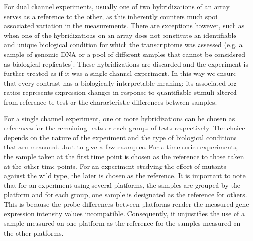For dual channel experiments, usually one of two hybridizations of an array
serves as a reference to the other, as this inherently counters much spot
associated variation in the measurements.
%
There are exceptions however, such as when one of the hybridizations on an
array does not constitute an identifiable and unique biological condition for
which the transcriptome was assessed (e.g. a sample of genomic DNA or a pool of
different samples that cannot be considered as biological replicates).
%
These hybridizations are discarded and the experiment is further treated as if
it was a single channel experiment.
%
In this way we ensure that every contrast has a biologically interpretable
meaning: its associated log-ratios represents expression changes in response
to quantifiable stimuli altered from reference to test or the characteristic
differences between samples.

For a single channel experiment, one or more hybridizations can be chosen as
references for the remaining tests or each groups of tests respectively.
%
The choice depends on the nature of the experiment and the type of biological
conditions that are measured.
%
Just to give a few examples.  For a time-series experiments, the sample taken
at the first time point is chosen as the reference to those taken at the other
time points.  For an experiment studying the effect of mutants against the wild
type, the later is chosen as the reference.
%
%
It is important to note that for an experiment using several platforms, the
samples are grouped by the platform and for each group, one sample is
designated as the reference for others.  This is because the probe differences
between platforms render the measured gene expression intensity values
incompatible.  Consequently, it unjustifies the use of a sample measured on
one platform as the reference for the samples measured on the other platforms.




